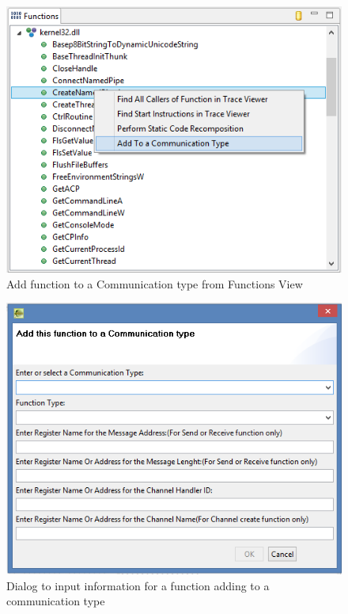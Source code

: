 \documentclass[paper=a4, fontsize=11pt]{scrartcl}
\numberwithin{equation}{section}		%
\numberwithin{figure}{section}			%
\numberwithin{table}{section}				%
\begin{document}
\begin{figure}[h]
\includegraphics{functionsview}
 \caption{Add function to a Communication type from Functions View}
\label{functionsview}
\end{figure}

\begin{figure}[h]
\includegraphics{dialog}
 \caption{Dialog to input information for a function adding to a communication type}
\label{dialog}
\end{figure}
\end{document}
